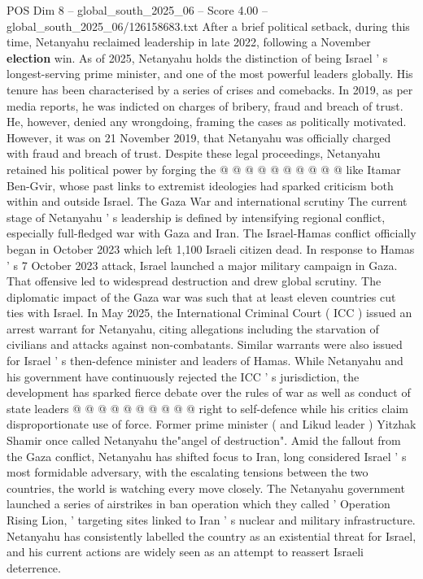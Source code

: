 \begin{textsample}{POS Dim 8 – global\_south\_2025\_06 – Score 4.00 – global\_south\_2025\_06/126158683.txt}
After a brief political setback, during this time, Netanyahu reclaimed leadership in late 2022, following a November \textbf{election} win.
As of 2025, Netanyahu holds the distinction of being Israel ' s longest-serving prime minister, and one of the most powerful leaders globally.
His tenure has been characterised by a series of crises and comebacks.
In 2019, as per media reports, he was indicted on charges of bribery, fraud and breach of trust.
He, however, denied any wrongdoing, framing the cases as politically motivated.
However, it was on 21 November 2019, that Netanyahu was officially charged with fraud and breach of trust.
Despite these legal proceedings, Netanyahu retained his political power by forging the @ @ @ @ @ @ @ @ @ @ like Itamar Ben-Gvir, whose past links to extremist ideologies had sparked criticism both within and outside Israel.
The Gaza War and international scrutiny The current stage of Netanyahu ' s leadership is defined by intensifying regional conflict, especially full-fledged war with Gaza and Iran.
The Israel-Hamas conflict officially began in October 2023 which left 1,100 Israeli citizen dead.
In response to Hamas ' s 7 October 2023 attack, Israel launched a major military campaign in Gaza.
That offensive led to widespread destruction and drew global scrutiny.
The diplomatic impact of the Gaza war was such that at least eleven countries cut ties with Israel.
In May 2025, the International Criminal Court ( ICC ) issued an arrest warrant for Netanyahu, citing allegations including the starvation of civilians and attacks against non-combatants.
Similar warrants were also issued for Israel ' s then-defence minister and leaders of Hamas.
While Netanyahu and his government have continuously rejected the ICC ' s jurisdiction, the development has sparked fierce debate over the rules of war as well as conduct of state leaders @ @ @ @ @ @ @ @ @ @ right to self-defence while his critics claim disproportionate use of force.
Former prime minister ( and Likud leader ) Yitzhak Shamir once called Netanyahu the"angel of destruction".
Amid the fallout from the Gaza conflict, Netanyahu has shifted focus to Iran, long considered Israel ' s most formidable adversary, with the escalating tensions between the two countries, the world is watching every move closely.
The Netanyahu government launched a series of airstrikes in ban operation which they called ' Operation Rising Lion, ' targeting sites linked to Iran ' s nuclear and military infrastructure.
Netanyahu has consistently labelled the country as an existential threat for Israel, and his current actions are widely seen as an attempt to reassert Israeli deterrence.

\end{textsample}
